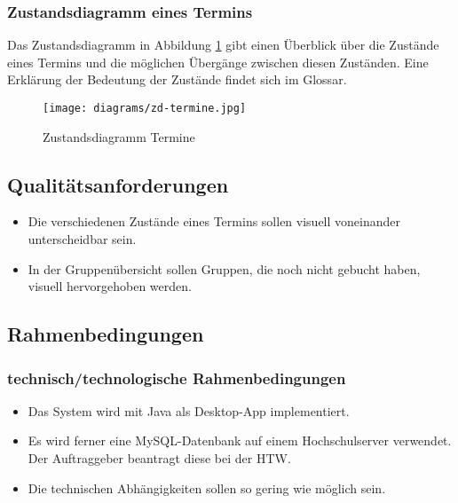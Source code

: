 \subsubsection{Zustandsdiagramm eines Termins}
Das Zustandsdiagramm in Abbildung \ref{fig:zd-termine} gibt einen Überblick über die Zustände eines Termins und die möglichen Übergänge zwischen diesen Zuständen. Eine Erklärung der Bedeutung der Zustände findet sich im Glossar.
\begin{figure}
  \centering
  \texttt{[image: diagrams/zd-termine.jpg]}
  \caption{Zustandsdiagramm Termine}
  \label{fig:zd-termine}
\end{figure}

\subsection{Qualitätsanforderungen}
\begin{itemize}
  \item Die verschiedenen Zustände eines Termins sollen visuell voneinander unterscheidbar sein.
  \item In der Gruppenübersicht sollen Gruppen, die noch nicht gebucht haben, visuell hervorgehoben werden.
\end{itemize}

\subsection{Rahmenbedingungen}
\subsubsection{technisch/technologische Rahmenbedingungen}
\begin{itemize}
  \item Das System wird mit Java als Desktop-App implementiert.
  \item Es wird ferner eine MySQL-Datenbank auf einem Hochschulserver verwendet. Der Auftraggeber beantragt diese bei der HTW.
  \item Die technischen Abhängigkeiten sollen so gering wie möglich sein.
\end{itemize}

